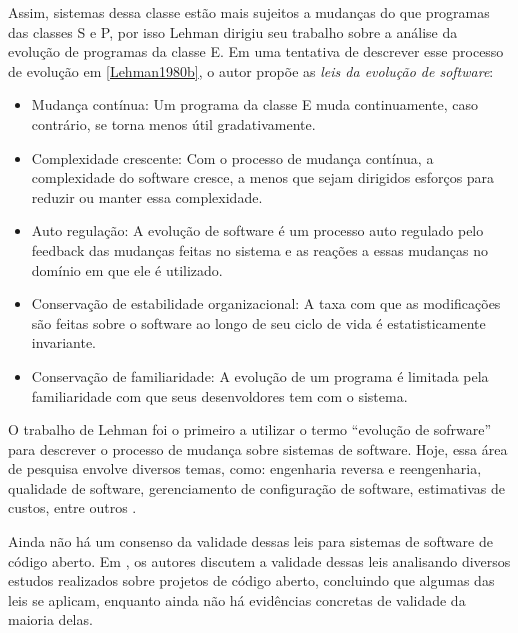 \documentclass[a4paper, 12pt, twoside]{book}
\begin{document}
        Assim, sistemas dessa classe estão mais sujeitos a mudanças do que programas das classes S 
        e P, por isso Lehman dirigiu seu trabalho sobre a análise da evolução de programas da 
        classe E. Em uma tentativa de descrever esse processo de evolução em \ref{Lehman1980b}, o 
        autor propõe as \textit{leis da evolução de software}:
        \begin{itemize}
            \item Mudança contínua: Um programa da classe E muda continuamente, caso contrário, se 
                   torna menos útil gradativamente.
            \item Complexidade crescente: Com o processo de mudança contínua, a complexidade do 
                  software cresce, a menos que sejam dirigidos esforços para reduzir ou manter essa 
                  complexidade.
            \item Auto regulação: A evolução de software é um processo auto regulado pelo feedback 
                  das mudanças feitas no sistema e as reações a essas mudanças no domínio em que ele 
                  é utilizado.
            \item Conservação de estabilidade organizacional: A taxa com que as modificações são 
                  feitas sobre o software ao longo de seu ciclo de vida é estatisticamente invariante.
            \item Conservação de familiaridade: A evolução de um programa é limitada pela 
                  familiaridade com que seus desenvoldores tem com o sistema.
        \end{itemize}

        O trabalho de Lehman foi o primeiro a utilizar o termo ``evolução de sofrware'' para
        descrever o processo de mudança sobre sistemas de software. Hoje, essa área de pesquisa
        envolve diversos temas, como: engenharia reversa e reengenharia, qualidade de software,
        gerenciamento de configuração de software, estimativas de custos, entre outros 
        \cite{DBLP:series/springer/Mens08}.
        
        Ainda não há um consenso da validade dessas leis para sistemas de software de código aberto. 
        Em  \cite{DBLP:series/springer/Fernandez-RamilLWC08}, os autores discutem a validade dessas
        leis analisando diversos estudos realizados sobre projetos de código aberto, concluindo que
        algumas das leis se aplicam, enquanto ainda não há evidências concretas de validade da 
        maioria delas.
        
\end{document}
